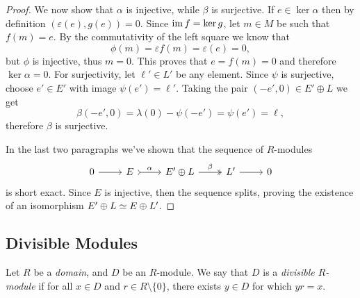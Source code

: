 \begin{proof}
    We now show that \(\alpha\) is injective, while
    \(\beta\) is surjective. If \(e \in \ker \alpha\) then by definition
    \((\varepsilon(e), g(e)) = 0\). Since \(\operatorname{im} f = \ker g\), let \(m \in M\) be
    such that \(f(m) = e\). By the commutativity of the left square we know that
    \[
        \phi(m) = \varepsilon f(m) = \varepsilon(e) = 0,
    \]
    but \(\phi\) is injective, thus \(m = 0\). This proves that \(e = f(m) = 0\) and
    therefore \(\ker \alpha = 0\). For surjectivity, let \(\ell' \in L'\) be any
    element. Since \(\psi\) is surjective, choose \(e' \in E'\) with image
    \(\psi(e') = \ell'\). Taking the pair \((-e', 0) \in E' \oplus L\) we get
    \[
        \beta(-e', 0) = \lambda(0) - \psi(-e') = \psi(e') = \ell,
    \]
    therefore \(\beta\) is surjective.

    In the last two paragraphs we've shown that the sequence of \(R\)-modules
    \[
        \begin{tikzcd}
            0 \ar[r]
            &E \ar[r, tail, "\alpha"]
            &E' \oplus L \ar[r, two heads, "\beta"]
            &L' \ar[r]
            &0
        \end{tikzcd}
    \]
    is short exact. Since \(E\) is injective, then the sequence splits, proving the
    existence of an isomorphism \(E' \oplus L \simeq E \oplus L'\).
\end{proof}

\subsection{Divisible Modules}

\begin{definition}
    \label{def:divisible-module}
    Let \(R\) be a \emph{domain}, and \(D\) be an \(R\)-module. We say that \(D\) is
    a \emph{divisible \(R\)-module} if for all \(x \in D\) and
    \(r \in R \setminus \{0\}\), there exists \(y \in D\) for which \(y r = x\).
\end{definition}


